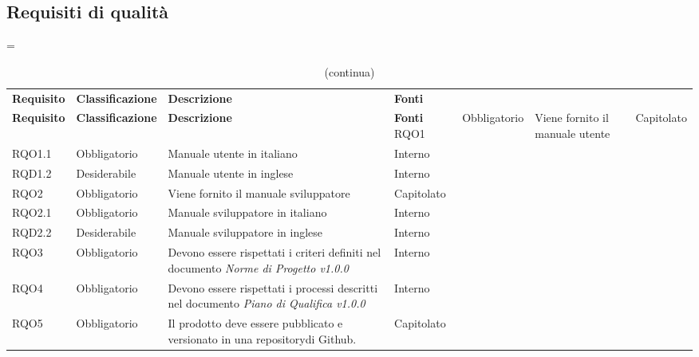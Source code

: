 \subsection{Requisiti di qualità}

\LTcapwidth=\linewidth
\begin{longtable}{ >{\centering}p{} >{\centering}p{}
		>{\raggedright}p{} >{\centering}p{}}
	\caption{Tabella dei requisiti di qualità}\\
	\rowcolorhead 
	\textbf{\color{white}Requisito} 
	& \textbf{\color{white}Classificazione} 
	& \centering\textbf{\color{white}Descrizione}
	& \textbf{\color{white}Fonti} 
	\endfirsthead
	\caption[]{(continua)}\\
	\rowcolorhead 
	\textbf{\color{white}Requisito} 
	& \textbf{\color{white}Classificazione} 
	& \centering\textbf{\color{white}Descrizione}
	& \textbf{\color{white}Fonti} 
	\endhead
	RQO1	&	Obbligatorio	&	Viene fornito il manuale utente	&	Capitolato	\tabularnewline
	RQO1.1	&	Obbligatorio	&	Manuale utente in italiano	&	Interno	\tabularnewline
	RQD1.2	&	Desiderabile	&	Manuale utente in inglese	&	Interno	\tabularnewline
	RQO2	&	Obbligatorio	&	Viene fornito il manuale sviluppatore	&	Capitolato	\tabularnewline
	RQO2.1	&	Obbligatorio	&		Manuale sviluppatore in italiano	&	Interno	\tabularnewline
	RQD2.2	&	Desiderabile	&		Manuale sviluppatore in inglese	&	Interno	\tabularnewline
	RQO3	&	Obbligatorio	&		Devono essere rispettati i criteri definiti nel documento \textit{Norme di Progetto v1.0.0}	&	Interno	\tabularnewline
	RQO4	& Obbligatorio	& 	Devono essere rispettati i processi descritti nel documento \textit{Piano di Qualifica v1.0.0} &	Interno \tabularnewline
	RQO5	&	Obbligatorio	&	Il prodotto deve essere pubblicato e versionato in una repository\glosp di Github\glo.	&	Capitolato
	\tabularnewline
	
\end{longtable}
	

